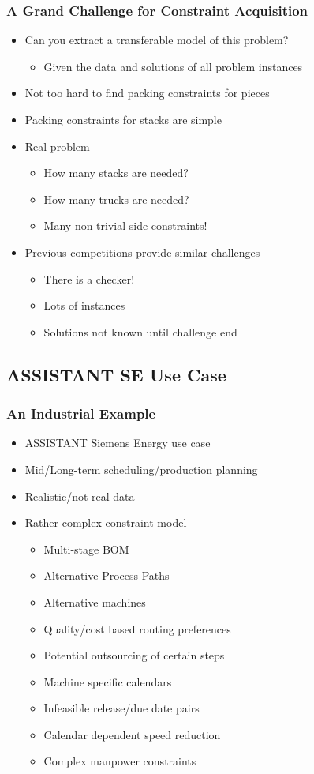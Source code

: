 \documentclass[dvipsnames,aspectratio=169]{beamer}
\begin{document}
\begin{frame}
\frametitle{A Grand Challenge for Constraint Acquisition}
\begin{itemize}
\item Can you extract a transferable model of this problem?
\begin{itemize}
\item Given the data and solutions of all problem instances
\end{itemize}
\item Not too hard to find packing constraints for pieces
\item Packing constraints for stacks are simple
\item Real problem
\begin{itemize}
\item How many stacks are needed?
\item How many trucks are needed?
\item Many non-trivial side constraints!
\end{itemize}
\item Previous competitions provide similar challenges
\begin{itemize}
\item There is a checker!
\item Lots of instances
\item Solutions not known until challenge end
\end{itemize}

\end{itemize}
\end{frame}





\subsection{ASSISTANT SE Use Case}

\begin{frame}
\frametitle{An Industrial Example}
\begin{itemize}
\item ASSISTANT Siemens Energy use case
\item Mid/Long-term scheduling/production planning
\item Realistic/not real data
\item Rather complex constraint model
\begin{itemize}
\item Multi-stage BOM
\item Alternative Process Paths
\item Alternative machines
\item Quality/cost based routing preferences
\item Potential outsourcing of certain steps
\item Machine specific calendars
\item Infeasible release/due date pairs
\item Calendar dependent speed reduction
\item Complex manpower constraints  
\end{itemize}
\end{itemize}
\end{frame}
\end{document}
